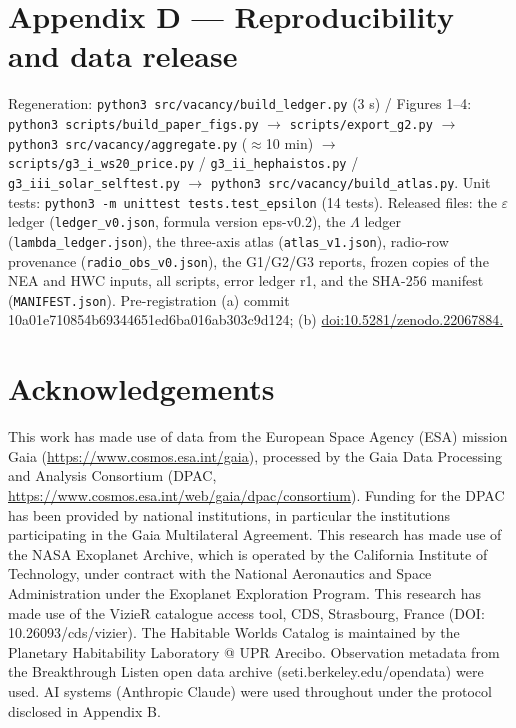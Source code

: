 \documentclass[11pt]{article}
\begin{document}
\section*{Appendix D --- Reproducibility and data release}
\noindent Regeneration: \texttt{python3 src/vacancy/build\_ledger.py} (3 s) / Figures 1--4: \texttt{python3 scripts/build\_paper\_figs.py} \(\rightarrow\) \texttt{scripts/export\_g2.py} \(\rightarrow\) \texttt{python3 src/vacancy/aggregate.py} (\(\approx\)10 min) \(\rightarrow\) \texttt{scripts/g3\_i\_ws20\_price.py} / \texttt{g3\_ii\_hephaistos.py} / \texttt{g3\_iii\_solar\_selftest.py} \(\rightarrow\) \texttt{python3 src/vacancy/build\_atlas.py}. Unit tests: \texttt{python3 -m unittest tests.test\_epsilon} (14 tests). Released files: the \(\varepsilon\) ledger (\texttt{ledger\_v0.json}, formula version eps-v0.2), the \(\Lambda\) ledger (\texttt{lambda\_ledger.json}), the three-axis atlas (\texttt{atlas\_v1.json}), radio-row provenance (\texttt{radio\_obs\_v0.json}), the G1/G2/G3 reports, frozen copies of the NEA and HWC inputs, all scripts, error ledger r1, and the SHA-256 manifest (\texttt{MANIFEST.json}). Pre-registration (a) commit 10a01e710854b69344651ed6ba016ab303c9d124; (b) \url{doi:10.5281/zenodo.22067884.}\par\smallskip

\section*{Acknowledgements}
\noindent This work has made use of data from the European Space Agency (ESA) mission Gaia (\url{https://www.cosmos.esa.int/gaia}), processed by the Gaia Data Processing and Analysis Consortium (DPAC, \url{https://www.cosmos.esa.int/web/gaia/dpac/consortium}). Funding for the DPAC has been provided by national institutions, in particular the institutions participating in the Gaia Multilateral Agreement. This research has made use of the NASA Exoplanet Archive, which is operated by the California Institute of Technology, under contract with the National Aeronautics and Space Administration under the Exoplanet Exploration Program. This research has made use of the VizieR catalogue access tool, CDS, Strasbourg, France (DOI: 10.26093/cds/vizier). The Habitable Worlds Catalog is maintained by the Planetary Habitability Laboratory @ UPR Arecibo. Observation metadata from the Breakthrough Listen open data archive (seti.berkeley.edu/opendata) were used. AI systems (Anthropic Claude) were used throughout under the protocol disclosed in Appendix B.\par\smallskip
\end{document}
